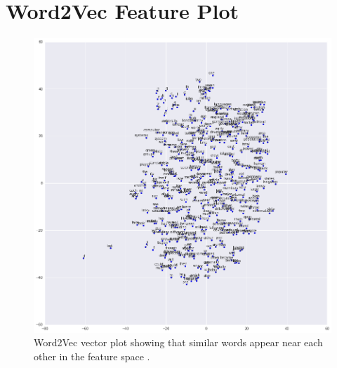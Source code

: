 \documentclass[12pt]{article}
\begin{document}
\newpage
\section{\\Word2Vec Feature Plot} \label{App:AppendixB}

\begin{figure}[htbp!]\centering
	\centering
	\includegraphics[scale=.5]{tsne.png}
	\caption{Word2Vec vector plot showing that similar words appear near each other in the feature space \cite{tensorflow}.}
\end{figure}

\newpage


\end{document}
